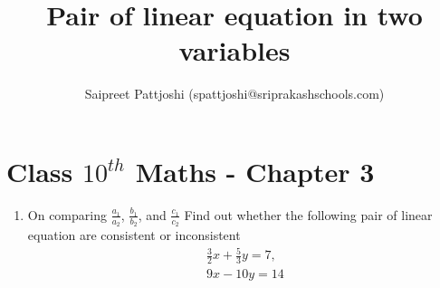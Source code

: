 \documentclass[12pt]{article}
\title{Pair of linear equation in two variables}
\author{Saipreet Pattjoshi (spattjoshi@sriprakashschools.com)}
\begin{document}
\maketitle
\section*{Class $10^{th}$ Maths - Chapter 3}
\begin{enumerate}
\item On comparing $\frac{a_1}{a_2}$, $\frac{b_1}{b_2}$, and $\frac{c_1}{c_2} $
Find out whether the following pair of linear equation are consistent or inconsistent\\
\begin{align}
 \frac{3}{2}x + \frac{5}{3}y=7,\\
9x-10y=14
 \end{align}
\\


\end{enumerate}
\end{document}
